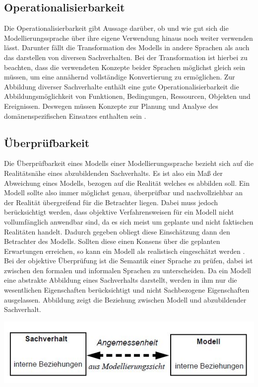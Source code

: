 \subsection{Operationalisierbarkeit}
\label{ssc:Operationalisierbarkeit}
Die Operationalisierbarkeit gibt Aussage darüber, ob und wie gut sich die Modellierungssprache über ihre eigene Verwendung hinaus noch weiter verwenden lässt.
Darunter fällt die Transformation des Modells in andere Sprachen als auch das darstellen von diversen Sachverhalten.
Bei der Transformation ist hierbei zu beachten, dass die verwendeten Konzepte beider Sprachen möglichst gleich sein müssen,
um eine annähernd vollständige Konvertierung zu ermöglichen. Zur Abbildung diverser Sachverhalte enthält eine gute Operationalisierbarkeit die Abbildungsmöglichkeit von Funktionen, Bedingungen, Ressourcen, Objekten und Ereignissen.
Deswegen müssen Konzepte zur Planung und Analyse des domänenspezifischen Einsatzes enthalten sein \cite[95\psq]{JaneFroeming_2009}.

\subsection{Überprüfbarkeit}
Die Überprüfbarkeit eines Modells einer Modellierungssprache bezieht sich auf die Realitätsnähe eines abzubildenden Sachverhalts. Es ist also ein Maß der Abweichung eines Modells, bezogen auf die Realität welches es abbilden soll.
Ein Modell sollte also immer möglichst genau, überprüfbar und nachvollziehbar an der Realität übergreifend für die Betrachter liegen. Dabei muss jedoch berücksichtigt werden, dass objektive Verfahrensweisen für ein Modell nicht vollumfänglich anwendbar sind, da es sich meist um geplante und nicht faktischen Realitäten handelt. Dadurch gegeben obliegt diese Einschätzung  dann den Betrachter des Modells. Sollten diese einen Konsens über die geplanten Erwartungen erreichen, so kann ein Modell als realistisch eingeschätzt werden \cite[3]{Becker_2012}. Bei der objektive Überprüfung ist die Semantik einer Sprache zu prüfen, dabei ist zwischen den formalen und informalen Sprachen zu unterscheiden. Da ein Modell eine abstrakte Abbildung eines Sachverhalts darstellt, werden in ihm nur die wesentlichen Eigenschaften berücksichtigt und nicht Sachbezogene Eigenschaften ausgelassen. Abbildung \pageref{fig:Beziehung} zeigt die Beziehung zwischen Modell und abzubildender Sachverhalt.

		\includegraphics[scale=1]{Graphics/Sachverhalt.jpg}
		\label{fig:Beziehung}

